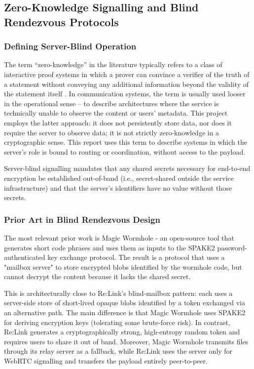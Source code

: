 \documentclass[12pt,a4paper]{article}
\begin{document}
\subsection{Zero-Knowledge Signalling and Blind Rendezvous Protocols}

\subsubsection{Defining Server-Blind Operation}

The term “zero-knowledge” in the literature typically refers to a class of interactive proof systems in which a prover can convince a verifier of the truth of a statement without conveying any additional information beyond the validity of the statement itself \cite{goldwasser1989}. In communication systems, the term is usually used looser in the operational sense – to describe architectures where the service is technically unable to observe the content or users’ metadata. This project employs the latter approach: it does not persistently store data, nor does it require the server to observe data; it is not strictly zero-knowledge in a cryptographic sense. This report uses this term to describe systems in which the server’s role is bound to routing or coordination, without access to the payload.

Server-blind signalling mandates that any shared secrets necessary for end-to-end encryption be established out-of-band (i.e., secret-shared outside the service infrastructure) and that the server’s identifiers have no value without those secrets.

\subsubsection{Prior Art in Blind Rendezvous Design}

The most relevant prior work is Magic Wormhole \cite{magicwormhole} - an open-source tool that generates short code phrases and uses them as inputs to the SPAKE2 password-authenticated key exchange protocol. The result is a protocol that uses a "mailbox server" to store encrypted blobs identified by the wormhole code, but cannot decrypt the content because it lacks the shared secret.

This is architecturally close to Re:Link’s blind-mailbox pattern: each uses a server-side store of short-lived opaque blobs identified by a token exchanged via an alternative path. The main difference is that Magic Wormhole uses SPAKE2 for deriving encryption keys (tolerating some brute-force risk). In contrast, Re:Link generates a cryptographically strong, high-entropy random token and requires users to share it out of band. Moreover, Magic Wormhole transmits files through its relay server as a fallback, while Re:Link uses the server only for WebRTC signalling and transfers the payload entirely peer-to-peer.
\end{document}

